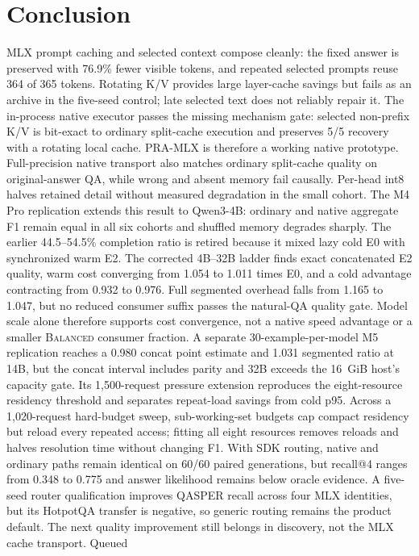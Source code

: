 \documentclass[10pt]{article}
\begin{document}
\section{Conclusion}
MLX prompt caching and selected context compose cleanly: the fixed answer is
preserved with 76.9\% fewer visible tokens, and repeated selected prompts reuse
364 of 365 tokens. Rotating K/V provides large layer-cache savings but fails as
an archive in the five-seed control; late selected text does not reliably
repair it. The in-process native executor passes the missing mechanism gate:
selected non-prefix K/V is bit-exact to ordinary split-cache execution and
preserves 5/5 recovery with a rotating local cache. PRA-MLX is therefore a
working native prototype. Full-precision native transport also matches ordinary
split-cache quality on original-answer QA, while wrong and absent memory fail
causally. Per-head int8 halves retained detail without measured degradation in
the small cohort. The M4 Pro replication extends this result to Qwen3-4B:
ordinary and native aggregate F1 remain equal in all six cohorts and shuffled
memory degrades sharply. The earlier 44.5--54.5\% completion ratio is retired
because it mixed lazy cold E0 with synchronized warm E2. The corrected 4B--32B
ladder finds exact concatenated E2 quality, warm cost converging from 1.054 to
1.011 times E0, and a cold advantage contracting from 0.932 to 0.976. Full
segmented overhead falls from 1.165 to 1.047, but no reduced consumer suffix
passes the natural-QA quality gate. Model scale alone therefore supports cost
convergence, not a native speed advantage or a smaller \textsc{Balanced}
consumer fraction. A separate 30-example-per-model M5 replication reaches a
0.980 concat point estimate and 1.031 segmented ratio at 14B, but the concat
interval includes parity and 32B exceeds the 16~GiB host's capacity gate. Its
1,500-request pressure
extension reproduces the eight-resource residency threshold and separates
repeat-load savings from cold p95. Across a 1,020-request hard-budget sweep, sub-working-set
budgets cap compact residency but reload every repeated access; fitting all
eight resources removes reloads and halves resolution time without changing
F1. With SDK routing, native and ordinary paths remain identical on 60/60
paired generations, but recall@4 ranges from 0.348 to 0.775 and answer
 likelihood remains below oracle evidence. A five-seed router qualification
 improves QASPER recall across four MLX identities, but its HotpotQA transfer is
 negative, so generic routing remains the product default. The next quality
 improvement still belongs in discovery, not the MLX cache transport. Queued
\end{document}

